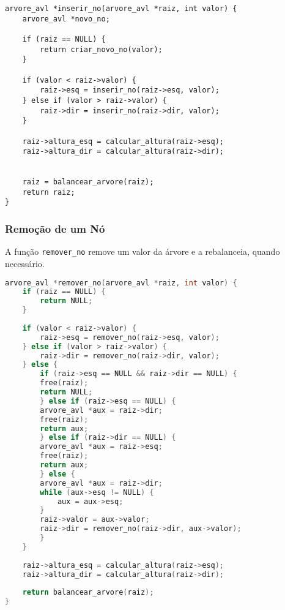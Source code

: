 \begin{lstlisting}
arvore_avl *inserir_no(arvore_avl *raiz, int valor) {
    arvore_avl *novo_no;
      
    if (raiz == NULL) {
        return criar_novo_no(valor);
    }
      
    if (valor < raiz->valor) {
        raiz->esq = inserir_no(raiz->esq, valor); 
    } else if (valor > raiz->valor) {
        raiz->dir = inserir_no(raiz->dir, valor); 
    }
      
    raiz->altura_esq = calcular_altura(raiz->esq);
    raiz->altura_dir = calcular_altura(raiz->dir);
      
      
    raiz = balancear_arvore(raiz);
    return raiz;
}
\end{lstlisting}

\vspace{3mm}

\subsubsection{Remoção de um Nó}

\vspace{3mm}

A função \texttt{remover\_no} remove um valor da árvore 
e a rebalanceia, quando necessário.

\begin{lstlisting}[language=C]
arvore_avl *remover_no(arvore_avl *raiz, int valor) {
    if (raiz == NULL) {
        return NULL;
    }
      
    if (valor < raiz->valor) {
        raiz->esq = remover_no(raiz->esq, valor);
    } else if (valor > raiz->valor) {
        raiz->dir = remover_no(raiz->dir, valor);
    } else {
        if (raiz->esq == NULL && raiz->dir == NULL) {
        free(raiz);
        return NULL;
        } else if (raiz->esq == NULL) {
        arvore_avl *aux = raiz->dir;
        free(raiz);
        return aux;
        } else if (raiz->dir == NULL) {
        arvore_avl *aux = raiz->esq;
        free(raiz);
        return aux;
        } else {
        arvore_avl *aux = raiz->dir;
        while (aux->esq != NULL) {
            aux = aux->esq;
        }
        raiz->valor = aux->valor;
        raiz->dir = remover_no(raiz->dir, aux->valor);
        }
    }
      
    raiz->altura_esq = calcular_altura(raiz->esq);
    raiz->altura_dir = calcular_altura(raiz->dir);
  
    return balancear_arvore(raiz);
}
\end{lstlisting}

